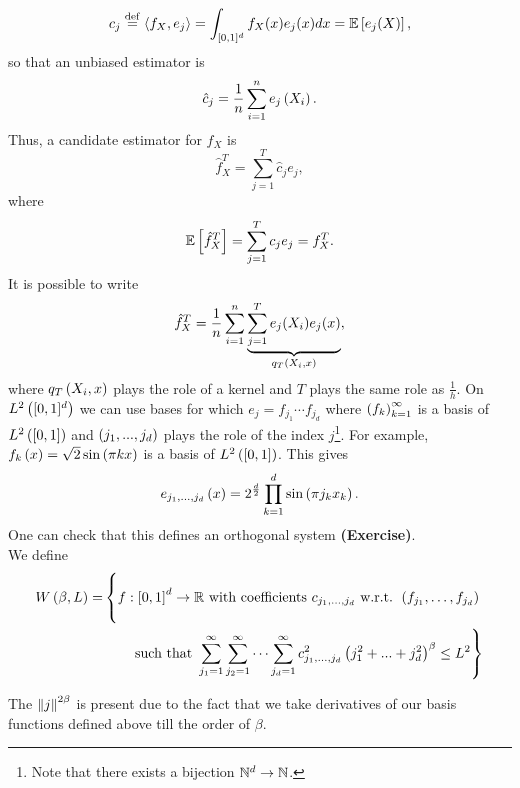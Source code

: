 \begin{equation*}
  c_j \overset{\mathrm{def}}{=} \left\langle f_X,e_j\right\rangle=\int_{[0,1]^d}f_X(x)e_j(x)dx = \mathbb{E}\left[e_j(X)\right],
\end{equation*}
so that an unbiased estimator is
\begin{equation*}
  \hat{c}_j = \frac{1}{n}\sum_{i=1}^n e_j\left(X_i\right).
\end{equation*}
Thus, a candidate estimator for $f_X$ is
\begin{equation*}
  \hat{f}_X^T = \sum_{j=1}^T \hat{c}_j e_j,
\end{equation*} where
\begin{equation*}
  \mathbb{E}\left[\hat{f}_X^T\right]=\sum_{j=1}^T c_j e_j = f_X^T.
\end{equation*}
It is possible to write
\begin{equation*}
  \hat{f}_X^T=\frac{1}{n} \sum_{i=1}^n \underbrace{\sum_{j=1}^T e_j(X_i)e_j(x)}_{q_T\left(X_i,x\right)},
\end{equation*}
where $q_T\left(X_i,x\right)$ plays the role of a kernel and $T$ plays the same role as $\frac{1}{h}$.
On $L^2\left([0,1]^d\right)$ we can use bases for which $e_j=f_{j_1}\cdots f_{j_d}$ where $\left(f_k\right)_{k=1}^\infty$ is a basis of $L^2\left([0,1]\right)$ and $\left(j_1,...,j_d\right)$ plays the role of the index $j$\footnote{Note that there exists a bijection $\mathbb{N}^d\rightarrow \mathbb{N}$.}.
For example, $f_{k}\left(x\right) = \sqrt{2}\sin\left(\pi k x\right)$ is a basis of $L^2\left([0,1]\right)$.
This gives
\begin{equation*}
  e_{j_1,\ldots,j_d} \left(x\right) = 2^{\frac{d}{2}} \prod_{k=1}^d \sin\left(\pi j_k x_k\right).
\end{equation*}
One can check that this defines an orthogonal system \textbf{(Exercise)}.
\\ We define
\begin{equation*}
  \begin{split}
    W\pa{\beta, L} = & \left\{ \vphantom{\sum_{j_d=1}^\infty}f: \bra{0,1}^d\rightarrow \R \text{ with coefficients } c_{{j_1},\ldots,{j_d}}\text{ w.r.t. } \pa{f_{j_1}, \ldots, f_{j_d}} \right. \\
                     & \quad\quad \left. \text{such that } \sum_{j_1=1}^\infty \sum_{j_2=1}^\infty\cdots \sum_{j_d=1}^\infty c_{j_1,...,j_d}^2\pa{j_1^2+...+j_d^2}^\beta\leq L^2 \right\}
  \end{split}
\end{equation*}

\begin{remark}
  The $\left\| j \right\|^{2\beta}$ is present due to the fact that we take derivatives of our basis functions defined above till the order of $\beta$.
\end{remark}

